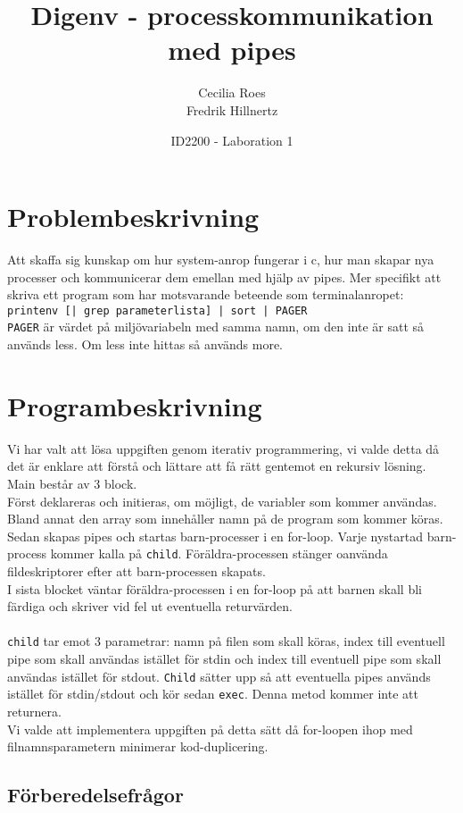 \documentclass[a4paper]{article}
\title{Digenv - processkommunikation med pipes}
\date{ID2200 - Laboration 1}
\author{Cecilia Roes \\ Fredrik Hillnertz}
\begin{document}
\maketitle

\section*{Problembeskrivning}
Att skaffa sig kunskap om hur system-anrop fungerar i c, hur man skapar nya processer och kommunicerar dem emellan med hjälp av pipes.
Mer specifikt att skriva ett program som har motsvarande beteende som terminalanropet: \texttt{printenv [| grep parameterlista] | sort | PAGER}
\\
\texttt{PAGER} är värdet på miljövariabeln med samma namn, om den inte är satt så används less. Om less inte hittas så används more.

\section*{Programbeskrivning}
Vi har valt att lösa uppgiften genom iterativ programmering, vi valde detta då det är enklare att förstå och lättare att få rätt gentemot en rekursiv lösning.
\\
Main består av 3 block.
\\
Först deklareras och initieras, om möjligt, de variabler som kommer användas. Bland annat den array som innehåller namn på de program som kommer köras.
\\
Sedan skapas pipes och startas barn-processer i en for-loop. Varje nystartad barn-process kommer kalla på \texttt{child}. Föräldra-processen stänger oanvända fildeskriptorer efter att barn-processen skapats.
\\
I sista blocket väntar föräldra-processen i en for-loop på att barnen skall bli färdiga och skriver vid fel ut eventuella returvärden.
\\
\\
\texttt{child} tar emot 3 parametrar: namn på filen som skall köras, index till eventuell pipe som skall användas istället för stdin och index till eventuell pipe som skall användas istället för stdout. \texttt{Child} sätter upp så att eventuella pipes används istället för stdin/stdout och kör sedan \texttt{exec}. Denna metod kommer inte att returnera.
\\
Vi valde att implementera uppgiften på detta sätt då for-loopen ihop med filnamnsparametern minimerar kod-duplicering.

\subsection*{Förberedelsefrågor}
\end{document}

